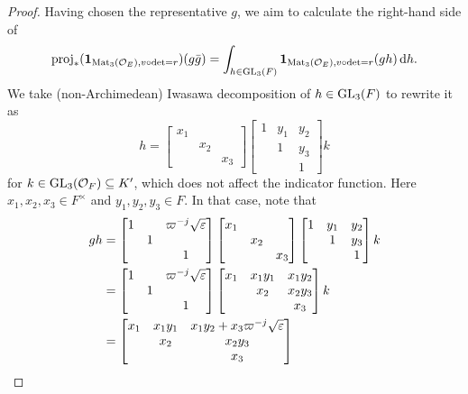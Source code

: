 \begin{proof}
  Having chosen the representative $g$, we aim to calculate the right-hand side of
  \[
    \rproj_\ast(\mathbf{1}_{\Mat_3(\OO_E), v\circ\det=r})(g\bar{g})
    = \int_{h \in \GL_3(F)} \mathbf{1}_{\Mat_3(\OO_E), v\circ\det=r}(gh) \odif h.
  \]
  We take (non-Archimedean) Iwasawa decomposition of $h \in \operatorname{GL}_3(F)$ to rewrite it as
  \[
    h =
    \begin{bmatrix} x_1 \\ & x_2 \\ && x_3 \end{bmatrix}
    \begin{bmatrix} 1 & y_1 & y_2 \\ & 1 & y_3 \\ & & 1 \end{bmatrix}
    k
  \]
  for $k \in \operatorname{GL}_3(\mathcal O_F) \subseteq K'$, which does not affect the indicator function.
  Here $x_1, x_2, x_3 \in F^\times$ and $y_1, y_2, y_3 \in F$.
  In that case, note that
  \begin{align*}
    gh
    &=
    \begin{bmatrix}
      1 &   & \varpi^{-j}\sqrt{\varepsilon} \\
      & 1 \\
      &   & 1
    \end{bmatrix}
    \begin{bmatrix} x_1 \\ & x_2 \\ && x_3 \end{bmatrix}
    \begin{bmatrix} 1 & y_1 & y_2 \\ & 1 & y_3 \\ & & 1 \end{bmatrix} k \\
    &=
    \begin{bmatrix}
      1 &   & \varpi^{-j}\sqrt{\varepsilon} \\
      & 1 \\
      &   & 1
    \end{bmatrix}
    \begin{bmatrix} x_1 & x_1 y_1 & x_1 y_2 \\ & x_2 & x_2 y_3 \\ & & x_3 \end{bmatrix} k \\
    &=
    \begin{bmatrix}
      x_1 & x_1 y_1 & x_1 y_2 + x_3 \varpi^{-j} \sqrt{\varepsilon} \\
      & x_2 & x_2 y_3 \\
      & & x_3

\end{bmatrix}
\end{align*}
\end{proof}
